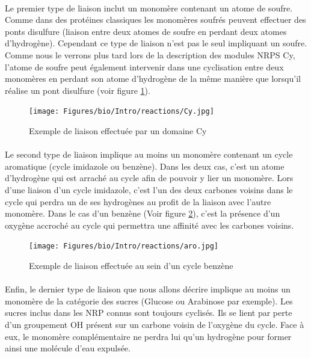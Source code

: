 \documentclass[12pt,french,twoside]{report}
\begin{document}
\paragraph{}Le premier type de liaison inclut un monomère contenant un atome de soufre.
Comme dans des protéines classiques les monomères soufrés peuvent effectuer des ponts disulfure (liaison entre deux atomes de soufre en perdant deux atomes d'hydrogène).
Cependant ce type de liaison n'est pas le seul impliquant un soufre.
Comme nous le verrons plus tard lors de la description des modules NRPS Cy, l'atome de soufre peut également intervenir dans une cyclisation entre deux monomères en perdant son atome d'hydrogène de la même manière que lorsqu'il réalise un pont disulfure (voir figure \ref{Cy_link}).

\begin{figure}[h!]
  \begin{center}
    \texttt{[image: Figures/bio/Intro/reactions/Cy.jpg]}
    \caption{\label{Cy_link}Exemple de liaison effectuée par un domaine Cy}
  \end{center}
\end{figure}

\paragraph{}Le second type de liaison implique au moins un monomère contenant un cycle aromatique (cycle imidazole ou benzène).
Dans les deux cas, c'est un atome d'hydrogène qui est arraché au cycle afin de pouvoir y lier un monomère.
Lors d'une liaison d'un cycle imidazole, c'est l'un des deux carbones voisins dans le cycle qui perdra un de ses hydrogènes au profit de la liaison avec l'autre monomère.
Dans le cas d'un benzène (Voir figure \ref{benzene}), c'est la présence d'un oxygène accroché au cycle qui permettra une affinité avec les carbones voisins.

\begin{figure}[h!]
  \begin{center}
    \texttt{[image: Figures/bio/Intro/reactions/aro.jpg]}
    \caption{\label{benzene}Exemple de liaison effectuée au sein d'un cycle benzène}
  \end{center}
\end{figure}

\paragraph{}Enfin, le dernier type de liaison que nous allons décrire implique au moins un monomère de la catégorie des sucres (Glucose ou Arabinose par exemple).
Les sucres inclus dans les NRP connus sont toujours cyclisés.
Ils se lient par perte d'un groupement OH présent sur un carbone voisin de l'oxygène du cycle.
Face à eux, le monomère complémentaire ne perdra lui qu'un hydrogène pour former ainsi une molécule d'eau expulsée.
\end{document}
